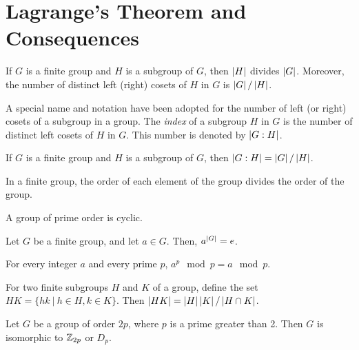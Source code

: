 \section{Lagrange's Theorem and Consequences}

\begin{theorem}
	If $G$ is a finite group and $H$ is a subgroup of $G$, then $\left\lvert H \right\rvert$ divides $\left\lvert G \right\rvert$. Moreover, the number of distinct left (right) cosets of $H$ in $G$ is $\left\lvert G \right\rvert/\left\lvert H \right\rvert$.
\end{theorem}

\begin{remark}
	A special name and notation have been adopted for the number of left (or right) cosets of a subgroup in a group. The \textit{index} of a subgroup $H$ in $G$ is the number of distinct left cosets of $H$ in $G$. This number is denoted by $\left\lvert G:H \right\rvert$.
\end{remark}

\begin{corollary}[$\mathbf{\abs{G:H} = \abs{G}/\abs{H}}$]
	If $G$ is a finite group and $H$ is a subgroup of $G$, then $\left\lvert G:H \right\rvert = \left\lvert G \right\rvert/\left\lvert H \right\rvert$.
\end{corollary}

\begin{corollary}
	In a finite group, the order of each element of the group divides the order of the group.
\end{corollary}

\begin{corollary}
	A group of prime order is cyclic.
\end{corollary}

\begin{corollary}[$\mathbf{a^{\abs{G}}=e}$]
	Let $G$ be a finite group, and let $a \in G$. Then, $a^{\left\lvert G \right\rvert} = e$.
\end{corollary}

\begin{corollary}
	For every integer $a$ and every prime $p$, $a^p \mod p = a \mod p$.
\end{corollary}

\begin{theorem}[$\mathbf{\abs{HK} = \abs{H}\abs{K}/\abs{H \cap K}}$]
	For two finite subgroups $H$ and $K$ of a group, define the set $HK = \{hk\ \vert\ h \in H, k \in K\}$. Then $\left\lvert HK \right\rvert = \left\lvert H \right\rvert\left\lvert K \right\rvert/\left\lvert H \cap K \right\rvert$.
\end{theorem}

\begin{theorem}
	Let $G$ be a group of order $2p$, where $p$ is a prime greater than 2. Then $G$ is isomorphic to $\mathbb{Z}_{2p}$ or $D_p$.
\end{theorem}

